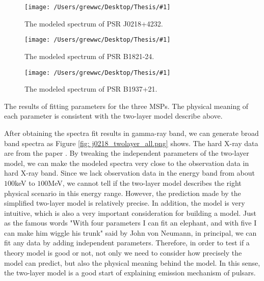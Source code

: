 \documentclass[12pt]{report}
\newcommand{\mycaption}[1]{\protect \caption{#1}}
\newcommand{\singleFig}[3]{
  \begin{figure}[!ht]
    \centering
    \texttt{[image: /Users/grewwc/Desktop/Thesis/\#1]}
    \caption{#3}
    \label{fig: #1}
  \end{figure}
}
\newcommand{\change}[1]{
  $<$\colorbox{red}{\textbf{change}}$>$#1$<$\colorbox{red}{\textbf{/change}}$>$
}
\newcommand{\mayChange}[1]{
  $<$\colorbox{red}{\textbf{mayChange}}$>$#1$<$\colorbox{red}{\textbf{/mayChange}}$>$
}
\begin{document}
        \singleFig{j0218_twolayer_cur.png}{0.37}{The modeled spectrum of PSR J0218+4232.}
        \singleFig{b1821_twolayer_cur.png}{0.37}{The modeled spectrum of PSR B1821-24.}
        \singleFig{j1939_twolayer_cur.png}{0.38}{The modeled spectrum of PSR B1937+21.}
        
        \begin{table}[!ht]
          \centering
          \mycaption{The results of fitting parameters for the three MSPs. The physical 
            meaning of each parameter is consistent with the two-layer model describe above.}
          \label{table: twolayer_fit_parameter}
        \end{table}
        \vspace{0.5cm}
          
        After obtaining the spectra fit results in gamma-ray band, we can generate broad band 
        spectra as Figure \ref{fig: j0218_twolayer_all.png} shows. 
        The hard X-ray data are from the paper \cite{0004-637X-845-2-159}. By tweaking the 
        independent parameters of the two-layer model, we can make the modeled spectra very 
        close to the observation data in hard X-ray band. Since we lack observation data in 
        the energy band from about $100$keV to $100$MeV, we cannot tell if the two-layer model 
        describes the right physical scenario in this energy range. However, the prediction made 
        by the simplified two-layer model is relatively precise. In addition, the model is very 
        intuitive, which is also a very important consideration for building a model. Just as 
        the famous words "With four parameters I can fit an elephant, and with five I 
        can make him wiggle his trunk" 
        said by John von Neumann, in principal, we can fit any data by adding independent 
        parameters. Therefore, in order to test if a theory model is good or not, not only we 
        need to consider how precisely the model can predict, but also the physical meaning 
        behind the model. In this sense, the two-layer model is a good start of explaining 
        emission mechanism of pulsars. 
          
\end{document}
